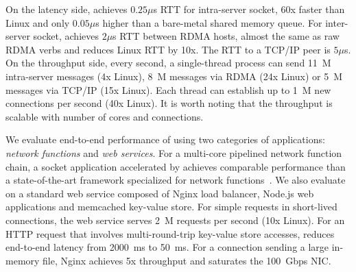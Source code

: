 On the latency side, \sys{} achieves $0.25\mu$s RTT for intra-server socket, 60x faster than Linux and only $0.05\mu$s higher than a bare-metal shared memory queue. For inter-server socket, \sys{} achieves $2\mu$s RTT between RDMA hosts, almost the same as raw RDMA verbs and reduces Linux RTT by 10x. The RTT to a TCP/IP peer is $5\mu$s. On the throughput side, every second, a single-thread process can send 11~M intra-server messages (4x Linux), 8~M messages via RDMA (24x Linux) or 5~M messages via TCP/IP (15x Linux). Each thread can establish up to 1~M new connections per second (40x Linux). It is worth noting that the throughput is scalable with number of cores and connections.

We evaluate end-to-end performance of \sys{} using two categories of applications: \textit{network functions} and \textit{web services}. For a multi-core pipelined network function chain, a socket application accelerated by \sys{} achieves comparable performance than a state-of-the-art framework specialized for network functions~\cite{panda2016netbricks}. We also evaluate \sys{} on a standard web service composed of Nginx load balancer, Node.js web applications and memcached key-value store. For simple requests in short-lived connections, the web service serves 2~M requests per second (10x Linux). For an HTTP request that involves multi-round-trip key-value store accesses, \sys{} reduces end-to-end latency from 2000~ms to 50~ms. For a connection sending a large in-memory file, Nginx achieves 5x throughput and saturates the 100~Gbps NIC.
